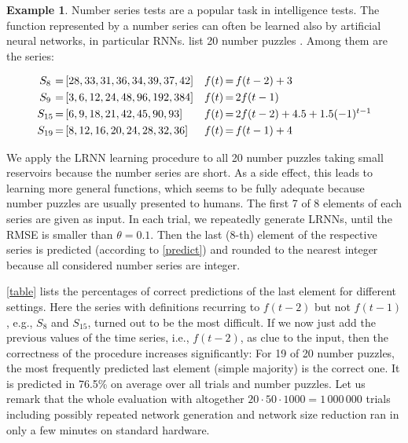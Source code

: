 \documentclass[twoside,11pt]{article}
\theoremstyle{definition}
\newtheorem{exmp}{Example}
\begin{document}
\begin{exmp}
Number series tests are a popular task in intelligence tests. The function
represented by a number series can often be learned also by artificial neural
networks, in particular RNNs. \citet{GW13} list 20 number puzzles \citep[cf.][]{RK11}.
Among them are the series:

\[ \begin{array}{c@{\,=\,}lc@{\,=\,}l}
	S_8 & [28,33,31,36,34,39,37,42] & f(t) & f(t-2) + 3\\[3pt]
	S_9 & [3,6,12,24,48,96,192,384] & f(t) & 2 f(t-1)\\[3pt]
	S_{15} & [6,9,18,21,42,45,90,93] & f(t) & 2 f(t-2) + 4.5 + 1.5 (-1)^{t-1}\\[3pt]
	S_{19} & [8,12,16,20,24,28,32,36] & f(t) & f(t-1) + 4
\end{array} \]
\end{exmp}

We apply the LRNN learning procedure to all 20 number puzzles taking small
reservoirs because the number series are short. As a side effect, this leads to
learning more general functions, which seems to be fully adequate because number
puzzles are usually presented to humans. The first 7 of 8 elements of each
series are given as input. In each trial, we repeatedly generate LRNNs, until the
RMSE is smaller than $\theta=0.1$. Then the last (8-th) element of the
respective series is predicted (according to \cref{predict}) and rounded to the
nearest integer because all considered number series are integer.

\cref{table} lists the percentages of correct predictions of the last
element for different settings. Here the series with definitions recurring to
$f(t-2)$ but not $f(t-1)$, e.g., $S_8$ and $S_{15}$, turned out to be the most
difficult. If we now just add the previous values of the time series, i.e., $f(t-2)$,
as clue to the input, then the correctness of the procedure increases
significantly: For 19 of 20 number puzzles, the most frequently predicted last
element (simple majority) is the correct one. It is predicted in 76.5\% on
average over all trials and number puzzles. Let us remark that the whole
evaluation with altogether $20 \cdot 50 \cdot 1000 = 1\,000\,000$ trials
including possibly repeated network generation and network size reduction ran in
only a few minutes on standard hardware.
\end{document}
